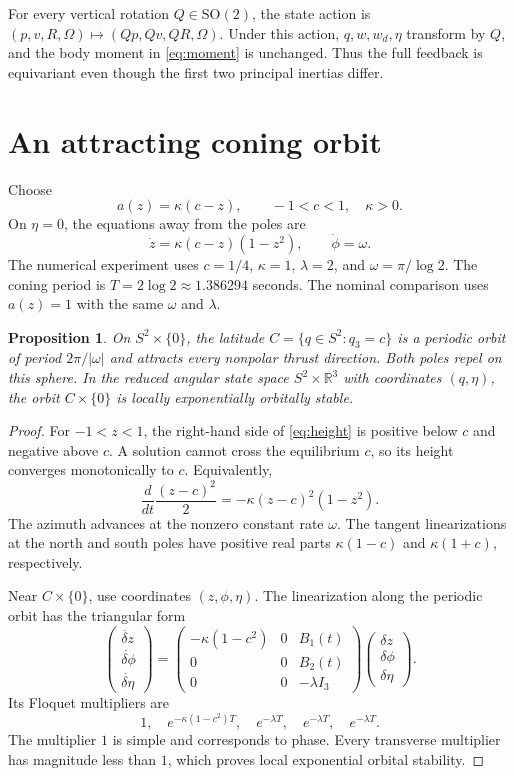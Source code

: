 \documentclass[11pt]{article}
\newtheorem{proposition}{Proposition}
\newcommand{\R}{\mathbb R}
\newcommand{\SO}{\mathrm{SO}}
\begin{document}
For every vertical rotation $Q\in\SO(2)$, the state action is $(p,v,R,\Omega)\mapsto(Qp,Qv,QR,\Omega)$. Under this action, $q,w,w_d,\eta$ transform by $Q$, and the body moment in \eqref{eq:moment} is unchanged. Thus the full feedback is equivariant even though the first two principal inertias differ.

\section{An attracting coning orbit}
Choose
\[
 a(z)=\kappa(c-z),\qquad -1<c<1,\quad \kappa>0.
\]
On $\eta=0$, the equations away from the poles are
\begin{equation}\label{eq:height}
 \dot z=\kappa(c-z)(1-z^2),\qquad \dot\phi=\omega.
\end{equation}
The numerical experiment uses $c=1/4$, $\kappa=1$, $\lambda=2$, and $\omega=\pi/\log2$. The coning period is $T=2\log2\approx1.386294$ seconds. The nominal comparison uses $a(z)=1$ with the same $\omega$ and $\lambda$.

\begin{proposition}\label{prop:orbit}
On $S^2\times\{0\}$, the latitude $C=\{q\in S^2:q_3=c\}$ is a periodic orbit of period $2\pi/|\omega|$ and attracts every nonpolar thrust direction. Both poles repel on this sphere. In the reduced angular state space $S^2\times\R^3$ with coordinates $(q,\eta)$, the orbit $C\times\{0\}$ is locally exponentially orbitally stable.
\end{proposition}
\begin{proof}
For $-1<z<1$, the right-hand side of \eqref{eq:height} is positive below $c$ and negative above $c$. A solution cannot cross the equilibrium $c$, so its height converges monotonically to $c$. Equivalently,
\[
 \frac{d}{dt}\frac{(z-c)^2}{2}=-\kappa(z-c)^2(1-z^2).
\]
The azimuth advances at the nonzero constant rate $\omega$. The tangent linearizations at the north and south poles have positive real parts $\kappa(1-c)$ and $\kappa(1+c)$, respectively.

Near $C\times\{0\}$, use coordinates $(z,\phi,\eta)$. The linearization along the periodic orbit has the triangular form
\[
 \begin{pmatrix}\dot{\delta z}\\\dot{\delta\phi}\\\dot{\delta\eta}\end{pmatrix}
 =\begin{pmatrix}-\kappa(1-c^2)&0&B_1(t)\\0&0&B_2(t)\\0&0&-\lambda I_3\end{pmatrix}
 \begin{pmatrix}\delta z\\\delta\phi\\\delta\eta\end{pmatrix}.
\]
Its Floquet multipliers are
\[
 1,\quad e^{-\kappa(1-c^2)T},\quad e^{-\lambda T},\quad e^{-\lambda T},\quad e^{-\lambda T}.
\]
The multiplier $1$ is simple and corresponds to phase. Every transverse multiplier has magnitude less than $1$, which proves local exponential orbital stability.
\end{proof}
\end{document}
